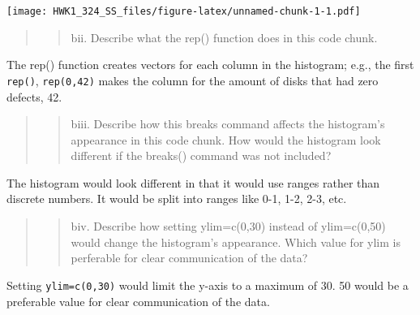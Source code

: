 \documentclass[
]{article}
\begin{document}
\texttt{[image: HWK1\_324\_SS\_files/figure-latex/unnamed-chunk-1-1.pdf]}

\begin{quote}
\begin{quote}
bii. Describe what the rep() function does in this code chunk.
\end{quote}
\end{quote}

The rep() function creates vectors for each column in the histogram;
e.g., the first \texttt{rep()}, \texttt{rep(0,42)} makes the column for
the amount of disks that had zero defects, 42.

\begin{quote}
\begin{quote}
biii. Describe how this breaks command affects the histogram's
appearance in this code chunk. How would the histogram look different if
the breaks() command was not included?
\end{quote}
\end{quote}

The histogram would look different in that it would use ranges rather
than discrete numbers. It would be split into ranges like 0-1, 1-2, 2-3,
etc.

\begin{quote}
\begin{quote}
biv. Describe how setting ylim=c(0,30) instead of ylim=c(0,50) would
change the histogram's appearance. Which value for ylim is perferable
for clear communication of the data?
\end{quote}
\end{quote}

Setting \texttt{ylim=c(0,30)} would limit the y-axis to a maximum of 30.
50 would be a preferable value for clear communication of the data.

\vspace{1cm}
\end{document}
